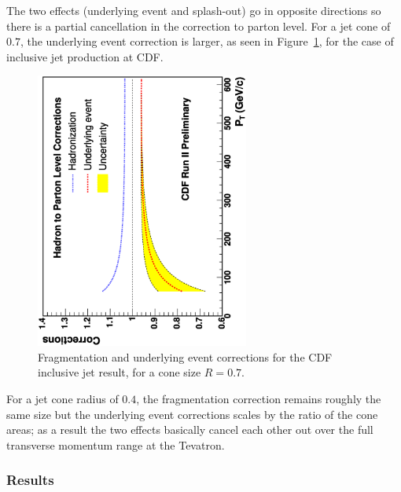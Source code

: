 \documentclass[12pt]{iopart}
\begin{document}
The two effects (underlying event and splash-out) go in opposite directions so there is a  partial cancellation in the correction to
parton level. For a jet cone of $0.7$, the underlying  event correction is larger, as seen in Figure~\ref{fig:cdf_jet_cor}, for the 
case of inclusive  jet production at CDF. 
%
\begin{figure}[t]
\begin{center}
\includegraphics[width=7cm,angle=-90]{incjet_xsec_corr_uehadr_h2p_error.eps}
\end{center}
\caption{
Fragmentation and underlying event corrections for the CDF inclusive jet result, for a cone size $R=0.7$.
\label{fig:cdf_jet_cor}}
\end{figure}
%
For a jet cone radius of $0.4$, the fragmentation correction remains roughly the same size but  the underlying event corrections scales
by the ratio of the cone areas; as a result the two effects basically cancel each other out over the full transverse momentum range at
the Tevatron.  

\subsubsection{Results}
\label{sec:results}
\end{document}

